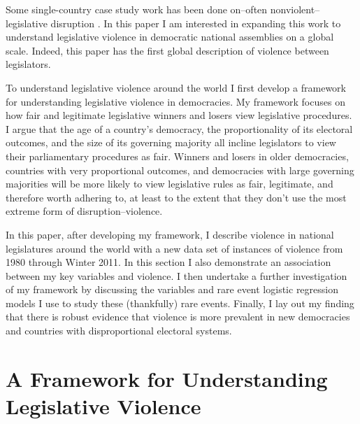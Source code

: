 \documentclass[a4paper]{article}\usepackage{graphicx, color}
\begin{document}
Some single-country case study work has been done on--often nonviolent--legislative disruption \cite[see][]{Armitage2013,Johnson2013,Ilie2013,Wolfe2004}. In this paper I am interested in expanding this work to understand legislative violence in democratic national assemblies on a global scale. Indeed, this paper has the first global description of violence between legislators. 

To understand legislative violence around the world I first develop a framework for understanding legislative violence in democracies. My framework focuses on how fair and legitimate legislative winners and losers view legislative procedures. I argue that the age of a country's democracy, the proportionality of its electoral outcomes, and the size of its governing majority all incline legislators to view their parliamentary procedures as fair. Winners and losers in older democracies, countries with very proportional outcomes, and democracies with large governing majorities will be more likely to view legislative rules as fair, legitimate, and therefore worth adhering to, at least to the extent that they don't use the most extreme form of disruption--violence. 

In this paper, after developing my framework, I describe violence in national legislatures around the world with a new data set of instances of violence from 1980 through Winter 2011. In this section I also demonstrate an association between my key variables and violence. I then undertake a further investigation of my framework by discussing the variables and rare event logistic regression models \citep{KingRareEvents2001, KingRareEventsPA2001} I use to study these (thankfully) rare events. Finally, I lay out my finding that there is robust evidence that violence is more prevalent in new democracies and countries with disproportional electoral systems. 


\section{A Framework for Understanding Legislative Violence}
\end{document}

